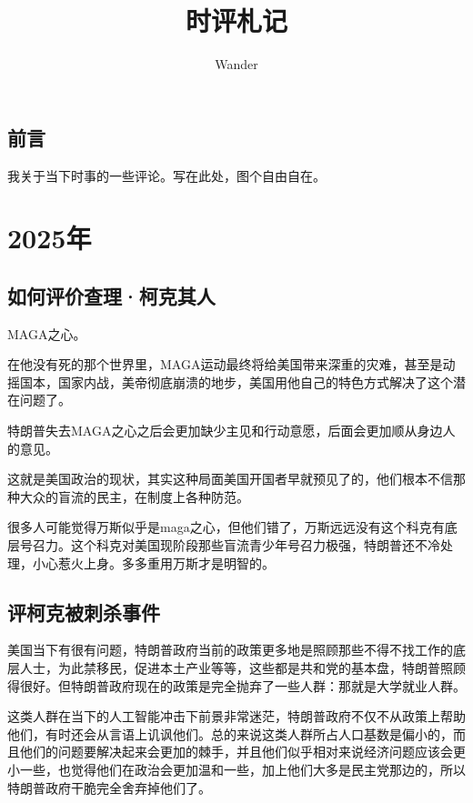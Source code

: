 \documentclass[12pt,oneside]{book}
\title{时评札记}
\author{Wander}
\begin{document}
\makemytitle



\frontmatter 
{}
\chapter*{前言}
我关于当下时事的一些评论。写在此处，图个自由自在。



\setcounter{tocdepth}{2}    
\tableofcontents


\mainmatter


\part{2025年}
\chapter{如何评价查理·柯克其人}
MAGA之心。

在他没有死的那个世界里，MAGA运动最终将给美国带来深重的灾难，甚至是动摇国本，国家内战，美帝彻底崩溃的地步，美国用他自己的特色方式解决了这个潜在问题了。

特朗普失去MAGA之心之后会更加缺少主见和行动意愿，后面会更加顺从身边人的意见。

这就是美国政治的现状，其实这种局面美国开国者早就预见了的，他们根本不信那种大众的盲流的民主，在制度上各种防范。

很多人可能觉得万斯似乎是maga之心，但他们错了，万斯远远没有这个科克有底层号召力。这个科克对美国现阶段那些盲流青少年号召力极强，特朗普还不冷处理，小心惹火上身。多多重用万斯才是明智的。

\chapter{评柯克被刺杀事件}
美国当下有很有问题，特朗普政府当前的政策更多地是照顾那些不得不找工作的底层人士，为此禁移民，促进本土产业等等，这些都是共和党的基本盘，特朗普照顾得很好。但特朗普政府现在的政策是完全抛弃了一些人群：那就是大学就业人群。

这类人群在当下的人工智能冲击下前景非常迷茫，特朗普政府不仅不从政策上帮助他们，有时还会从言语上讥讽他们。总的来说这类人群所占人口基数是偏小的，而且他们的问题要解决起来会更加的棘手，并且他们似乎相对来说经济问题应该会更小一些，也觉得他们在政治会更加温和一些，加上他们大多是民主党那边的，所以特朗普政府干脆完全舍弃掉他们了。
\end{document}

